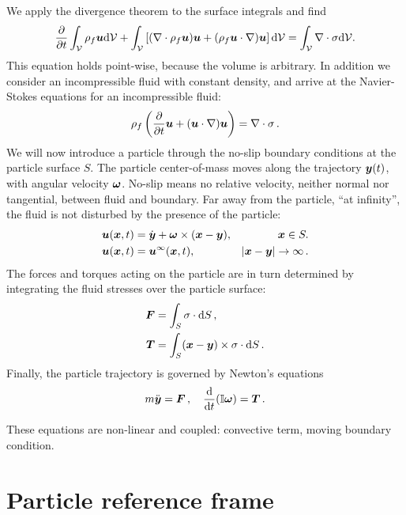 \documentclass[thesis.tex]{subfiles}
\begin{document}
We apply the divergence theorem to the surface integrals and find
\begin{align}
    \frac{\partial }{\partial t}\int_\mathcal V  \rho_f \mbox{\boldmath$u$} \mathrm{d}\mathcal V +
    \int_\mathcal V  \left[(\nabla\cdot\rho_f\mbox{\boldmath$u$}) \mbox{\boldmath$u$}+(\rho_f\mbox{\boldmath$u$}\cdot\nabla) \mbox{\boldmath$u$}\right] \mathrm{d} \mathcal V =
    \int_\mathcal V \nabla\cdot\mathbb{\sigma} \mathrm{d} \mathcal V.
\end{align}
This equation holds point-wise, because the volume is arbitrary. In addition we consider an incompressible fluid with constant density, and arrive at the Navier-Stokes equations for an incompressible fluid:
\begin{align}
    \rho_f \left(\frac{\partial }{\partial t}\mbox{\boldmath$u$} + (\mbox{\boldmath$u$} \cdot \nabla) \mbox{\boldmath$u$}\right)=\nabla \cdot \mathbb{\sigma}\,.
\end{align}
We will now introduce a particle through the no-slip boundary conditions at the particle surface $S$. The particle center-of-mass moves along the trajectory $\mbox{\boldmath$y$}(t)$, with angular velocity $\mbox{\boldmath$\omega$}$. No-slip means no relative velocity, neither normal nor tangential, between fluid and boundary. Far away from the particle, ``at infinity'', the fluid is not disturbed by the presence of the particle:
\begin{align}
    \mbox{\boldmath$u$}(\mbox{\boldmath$x$}, t) &= \dot{\mbox{\boldmath$y$}} + \mbox{\boldmath$\omega$} \times (\mbox{\boldmath$x$} - \mbox{\boldmath$y$}), & \mbox{\boldmath$x$} \in S. \nonumber\\
    \mbox{\boldmath$u$}(\mbox{\boldmath$x$}, t) &= \mbox{\boldmath$u$}^\infty(\mbox{\boldmath$x$}, t), & |\mbox{\boldmath$x$}-\mbox{\boldmath$y$}|\to\infty\,.
\end{align}
The forces and torques acting on the particle are in turn determined by integrating the fluid stresses over the particle surface:
\begin{align}
    \mbox{\boldmath$F$} &= \int_S \mathbb{\sigma} \cdot \mathrm{d} S\,, \\
    \mbox{\boldmath$T$} &= \int_S (\mbox{\boldmath$x$} - \mbox{\boldmath$y$}) \times \mathbb{\sigma} \cdot \mathrm{d} S\,.
\end{align}
Finally, the particle trajectory is governed by Newton's equations
\begin{align}
    m\ddot{\mbox{\boldmath$y$}} = \mbox{\boldmath$F$}\,, \quad \frac{\mathrm{d} }{\mathrm{d} t}(\mathbb{I} \mbox{\boldmath$\omega$}) = \mbox{\boldmath$T$}\,.
\end{align}

These equations are non-linear and coupled: convective term, moving boundary condition.

\section{Particle reference frame}
\end{document}
